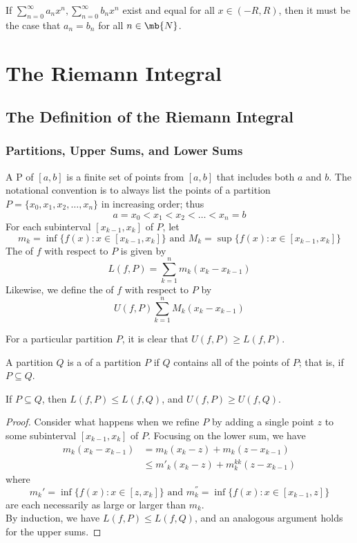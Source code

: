 \documentclass[11pt]{article}
\begin{document}
\corollary
If $\sum_{n=0}^\infty a_nx^n, \sum_{n=0}^\infty b_nx^n$ exist and equal for all $x \in (-R, R)$, then it must be the case that $a_n = b_n$ for all $n \in \mb{N}$.

\section{The Riemann Integral}
\subsection{The Definition of the Riemann Integral}
\subsubsection{Partitions, Upper Sums, and Lower Sums}

 A  P of $[a,b]$ is a finite set of points from $[a,b]$ that includes both $a$ and $b$. The notational convention is to always list the points of a partition $P = \{x_0, x_1, x_2, \hdots, x_n\}$ in increasing order; thus
$$a = x_0 < x_1 < x_2 < \hdots < x_n = b$$
For each subinterval $[x_{k-1}, x_k]$ of $P$, let
$$m_k = \inf\{f(x): x \in [x_{k-1}, x_k]\} \text{ and } M_k = \sup\{f(x): x \in [x_{k-1}, x_k]\}$$
The  of $f$ with respect to $P$ is given by
$$L(f, P) = \sum_{k=1}^n m_k(x_k - x_{k-1})$$
Likewise, we define the  of $f$ with respect to $P$ by
$$U(f, P) \sum_{k=1}^n M_k(x_k - x_{k-1})$$

\fact
For a particular partition $P$, it is clear that $U(f, P) \geq L(f, P)$.

A partition $Q$ is a  of a partition $P$ if $Q$ contains all of the points of $P$; that is, if $P \subseteq Q$.

\lemma If $P \subseteq Q$, then $L(f, P) \leq L(f, Q)$, and $U(f,P) \geq U(f,Q)$.

\begin{proof}
	Consider what happens when we refine $P$ by adding a single point $z$ to some subinterval $[x_{k-1}, x_k]$ of $P$. Focusing on the lower sum, we have
	\begin{align*}
		m_k(x_k - x_{k-1}) &= m_k(x_k - z) + m_k(z - x_{k-1}) \\
		&\leq m'_k(x_k - z) + m_k^{kk}(z - x_{k-1})
	\end{align*}
	where 
	$$m_k' = \inf\{ f(x): x \in [z, x_k]\} \text{ and } m_k^{''} = \inf \{f(x): x \in [x_{k-1},z]\}$$
	are each necessarily as large or larger than $m_k$.\\
	By induction, we have $L(f,P) \leq L(f,Q)$, and an analogous argument holds for the upper sums.
\end{proof}
\end{document}
